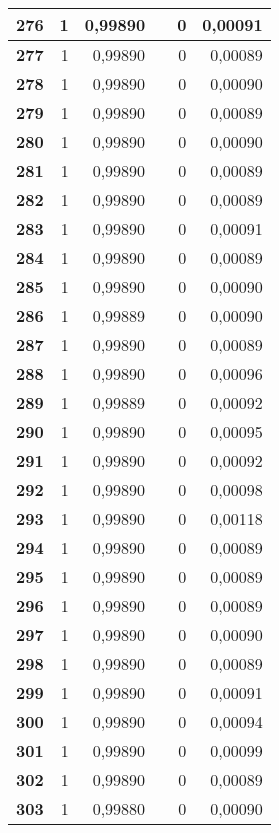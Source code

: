 \begin{longtable}{|r|r|r|l|r|r|}
\textbf{276} & 1 & 0,99890 &  & 0 & 0,00091 \\ \hline
\textbf{277} & 1 & 0,99890 &  & 0 & 0,00089 \\ \hline
\textbf{278} & 1 & 0,99890 &  & 0 & 0,00090 \\ \hline
\textbf{279} & 1 & 0,99890 &  & 0 & 0,00089 \\ \hline
\textbf{280} & 1 & 0,99890 &  & 0 & 0,00090 \\ \hline
\textbf{281} & 1 & 0,99890 &  & 0 & 0,00089 \\ \hline
\textbf{282} & 1 & 0,99890 &  & 0 & 0,00089 \\ \hline
\textbf{283} & 1 & 0,99890 &  & 0 & 0,00091 \\ \hline
\textbf{284} & 1 & 0,99890 &  & 0 & 0,00089 \\ \hline
\textbf{285} & 1 & 0,99890 &  & 0 & 0,00090 \\ \hline
\textbf{286} & 1 & 0,99889 &  & 0 & 0,00090 \\ \hline
\textbf{287} & 1 & 0,99890 &  & 0 & 0,00089 \\ \hline
\textbf{288} & 1 & 0,99890 &  & 0 & 0,00096 \\ \hline
\textbf{289} & 1 & 0,99889 &  & 0 & 0,00092 \\ \hline
\textbf{290} & 1 & 0,99890 &  & 0 & 0,00095 \\ \hline
\textbf{291} & 1 & 0,99890 &  & 0 & 0,00092 \\ \hline
\textbf{292} & 1 & 0,99890 &  & 0 & 0,00098 \\ \hline
\textbf{293} & 1 & 0,99890 &  & 0 & 0,00118 \\ \hline
\textbf{294} & 1 & 0,99890 &  & 0 & 0,00089 \\ \hline
\textbf{295} & 1 & 0,99890 &  & 0 & 0,00089 \\ \hline
\textbf{296} & 1 & 0,99890 &  & 0 & 0,00089 \\ \hline
\textbf{297} & 1 & 0,99890 &  & 0 & 0,00090 \\ \hline
\textbf{298} & 1 & 0,99890 &  & 0 & 0,00089 \\ \hline
\textbf{299} & 1 & 0,99890 &  & 0 & 0,00091 \\ \hline
\textbf{300} & 1 & 0,99890 &  & 0 & 0,00094 \\ \hline
\textbf{301} & 1 & 0,99890 &  & 0 & 0,00099 \\ \hline
\textbf{302} & 1 & 0,99890 &  & 0 & 0,00089 \\ \hline
\textbf{303} & 1 & 0,99880 &  & 0 & 0,00090 \\ \hline

\end{longtable}

